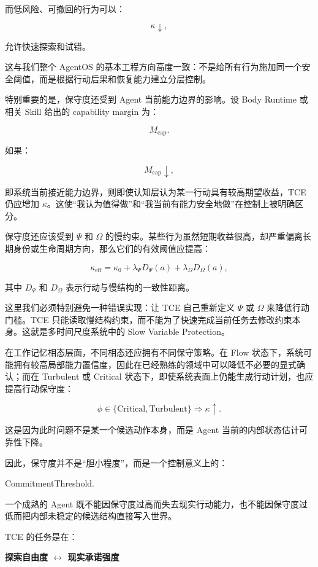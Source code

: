 而低风险、可撤回的行为可以：

\[
\kappa\downarrow,
\]

允许快速探索和试错。

这与我们整个 AgentOS 的基本工程方向高度一致：不是给所有行为施加同一个安全阈值，而是根据行动后果和恢复能力建立分层控制。

特别重要的是，保守度还受到 Agent 当前能力边界的影响。设 Body Runtime 或相关 Skill 给出的 capability margin 为：

\[
M_{\mathrm{cap}}.
\]

如果：

\[
M_{\mathrm{cap}}\downarrow,
\]

即系统当前接近能力边界，则即使认知层认为某一行动具有较高期望收益，TCE 仍应增加 $\kappa$。这使“我认为值得做”和“我当前有能力安全地做”在控制上被明确区分。

保守度还应该受到 $\Psi$ 和 $\Omega$ 的慢约束。某些行为虽然短期收益很高，却严重偏离长期身份或生命周期方向，那么它们的有效阈值应提高：

\[
\kappa_{\mathrm{eff}}
=
\kappa_0
+
\lambda_\Psi
D_\Psi(a)
+
\lambda_\Omega
D_\Omega(a),
\]

其中 $D_\Psi$ 和 $D_\Omega$ 表示行动与慢结构的一致性距离。

这里我们必须特别避免一种错误实现：让 TCE 自己重新定义 $\Psi$ 或 $\Omega$ 来降低行动门槛。TCE 只能读取慢结构约束，而不能为了快速完成当前任务去修改约束本身。这就是多时间尺度系统中的 Slow Variable Protection。

在工作记忆相态层面，不同相态还应拥有不同保守策略。在 Flow 状态下，系统可能拥有较高局部能力置信度，因此在已经熟练的领域中可以降低不必要的显式确认；而在 Turbulent 或 Critical 状态下，即使系统表面上仍能生成行动计划，也应提高行动保守度：

\[
\phi\in
\{\mathrm{Critical,Turbulent}\}
\Rightarrow
\kappa\uparrow.
\]

这是因为此时问题不是某一个候选动作本身，而是 Agent 当前的内部状态估计可靠性下降。

因此，保守度并不是“胆小程度”，而是一个控制意义上的：

\begin{statementbox}
CommitmentThreshold.
\end{statementbox}

一个成熟的 Agent 既不能因保守度过高而失去现实行动能力，也不能因保守度过低而把内部未稳定的候选结构直接写入世界。

TCE 的任务是在：

\begin{statementbox}
\centering\bfseries
探索自由度
$\longleftrightarrow$
现实承诺强度
\end{statementbox}

